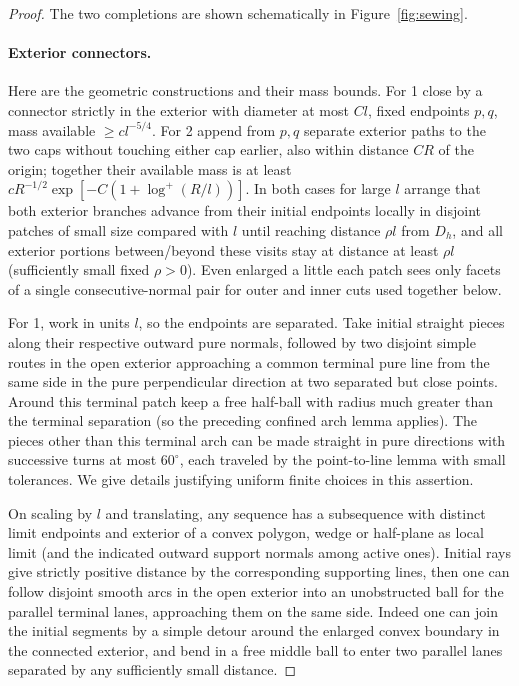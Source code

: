 \begin{proof}

The two completions are shown schematically in Figure~\ref{fig:sewing}.


\paragraph{Exterior connectors.}
Here are the geometric constructions and their mass bounds. For 1 close by a connector strictly in the exterior with diameter at most \(C l\), fixed endpoints \(p,q\), mass available \(\ge c l^{-5/4}\). For 2 append from \(p,q\) separate exterior paths to the two caps without touching either cap earlier, also within distance \(C R\) of the origin; together their available mass is at least \(cR^{-1/2}\exp[-C(1+\log^+(R/l))]\). In both cases for large \(l\) arrange that both exterior branches advance from their initial endpoints locally in disjoint patches of small size compared with \(l\) until reaching distance \(\rho l\) from \(D_h\), and all exterior portions between/beyond these visits stay at distance at least \(\rho l\) (sufficiently small fixed \(\rho>0\)). Even enlarged a little each patch sees only facets of a single consecutive-normal pair for outer and inner cuts used together below.

For 1, work in units \(l\), so the endpoints are separated. Take initial straight pieces along their respective outward pure normals, followed by two disjoint simple routes in the open exterior approaching a common terminal pure line from the same side in the pure perpendicular direction at two separated but close points. Around this terminal patch keep a free half-ball with radius much greater than the terminal separation (so the preceding confined arch lemma applies). The pieces other than this terminal arch can be made straight in pure directions with successive turns at most \(60^\circ\), each traveled by the point-to-line lemma with small tolerances. We give details justifying uniform finite choices in this assertion.

On scaling by \(l\) and translating, any sequence has a subsequence with distinct limit endpoints and exterior of a convex polygon, wedge or half-plane as local limit (and the indicated outward support normals among active ones). Initial rays give strictly positive distance by the corresponding supporting lines, then one can follow disjoint smooth arcs in the open exterior into an unobstructed ball for the parallel terminal lanes, approaching them on the same side. Indeed one can join the initial segments by a simple detour around the enlarged convex boundary in the connected exterior, and bend in a free middle ball to enter two parallel lanes separated by any sufficiently small distance. 


\end{proof}
